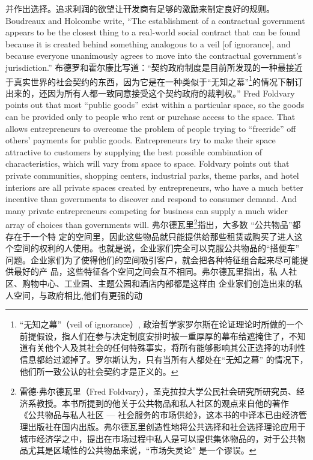 \begin{paracol}{2}
并作出选择。追求利润的欲望让幵发商有足够的激励来制定良好的规则。
\switchcolumn*
Boudreaux and Holcombe write, ``The establishment of a
contractual government appears to be the closest thing to a
real-world social contract that can be found because it is created
behind something analogous to a veil [of ignorance], and because everyone unanimously agrees to move into the contractual government's jurisdiction.''
\switchcolumn
布德罗和霍尔康比写道：“契约政府制度是目前所发现的一种最接近于真实世界的社会契约的东西，因为它是在一种类似于“无知之幕”\footnote{“无知之幕”（veil  of ignorance）, 政治哲学家罗尔斯在论证理论时所做的一个前提假设，指人们在参与决定制度安排时被一重厚厚的幕布给遮掩住了，不知道有关他个人及其社会的任何特殊事实，将所有能够影响其公正选择的功利性信息都给过滤掉了。罗尔斯认为，只有当所有人都处在“无知之幕” 的情况下，他们所一致公认的社会契约才是正义的。}的情况下制订出来的，还因为所有人都一致同意接受这个契约政府的裁判权。”
\switchcolumn*
Fred Foldvary points out that most ``public goods'' exist
within a particular space, so the goods can be provided only to
people who rent or purchase access to the space. That allows entrepreneurs to overcome the problem of people trying to ``freeride'' off others' payments for public goods. Entrepreneurs try
to make their space attractive to customers by supplying the
best possible combination of characteristics, which will vary
from space to space. Foldvary points out that private communities, shopping centers, industrial parks, theme parks, and hotel
interiors are all private spaces created by entrepreneurs, who
have a much better incentive than governments to discover and
respond to consumer demand. And many private entrepreneurs
competing for business can supply a much wider array of
choices than governments will.
\switchcolumn
弗尔德瓦里\footnote{雷德$\cdot$弗尔德瓦里（Fred Foldvary），圣克拉拉大学公民社会研究所研究员、经济系教授。本书所提到的他关于公共物品和私人社区的观点来自他的著作 《公共物品与私人社区 --- 社会服务的市场供给》，这本书的中译本已由经济管理出版社在国内出版。弗尔德瓦里创造性地将公共选择和社会选择理论应用于城市经济学之中，提出在市场过程中私人是可以提供集体物品的，对于公共物品尤其是区域性的公共物品来说，“市场失灵论” 是一个谬误。}指出，大多数 “公共物品”都存在于一个特
定的空间里，因此这些物品就只能提供给那些租赁或购买了进人这个空间的权利的人使用。也就是说，企业家们完全可以克服公共物品的“搭便车” 问题。企业家们为了使得他们的空间吸引客户，就会把各种特征组合起来尽可能提供最好的产
品，这些特征各个空间之间会互不相同。弗尔德瓦里指出，私
人社区、购物中心、工业园、主题公园和酒店内部都是这样由
企业家们创造出来的私人空间，与政府相比,他们有更强的动

\end{paracol}
